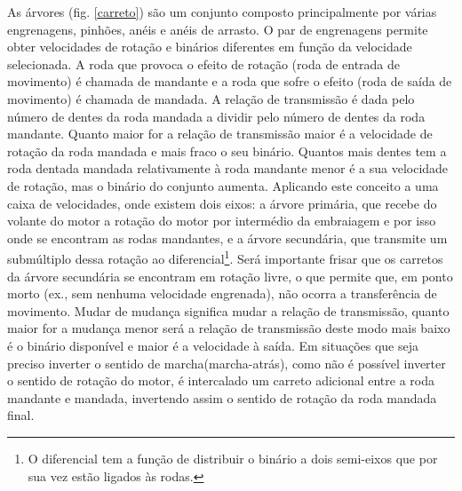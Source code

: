 As árvores (fig. \ref{carreto}) são um conjunto composto principalmente por várias engrenagens, pinhões, anéis e anéis de arrasto. O par de engrenagens permite obter velocidades de rotação e binários diferentes em função da velocidade selecionada. A roda que provoca o efeito de rotação (roda de entrada de movimento) é chamada de mandante e a roda que sofre o efeito (roda de saída de movimento) é chamada de mandada. A relação de transmissão é dada pelo número de dentes da roda mandada a dividir pelo número de dentes da roda mandante. Quanto maior for a relação de transmissão maior é a velocidade de rotação da roda mandada e mais fraco o seu binário. Quantos mais dentes tem a roda dentada mandada relativamente à roda mandante menor é a sua velocidade de rotação, mas o binário do conjunto aumenta. Aplicando este conceito a uma caixa de velocidades, onde existem dois eixos: a árvore primária, que recebe do volante do motor a rotação do motor por intermédio da embraiagem e por isso onde se encontram as rodas mandantes, e a árvore secundária, que transmite um submúltiplo dessa rotação ao diferencial\footnote{O diferencial tem a função de distribuir o binário a dois semi-eixos que por sua vez estão ligados às rodas.}. Será importante frisar que os carretos da árvore secundária se encontram em rotação livre, o que permite que, em ponto morto (ex., sem nenhuma velocidade engrenada), não ocorra a transferência de movimento.
Mudar de mudança significa mudar a relação de transmissão, quanto maior for a mudança menor será a relação de transmissão deste modo mais baixo é o binário disponível e maior é a velocidade à saída. Em situações que seja preciso inverter o sentido de marcha(marcha-atrás), como não é possível inverter o sentido de rotação do motor, é intercalado um carreto adicional entre a roda mandante e mandada, invertendo assim o sentido de rotação da roda mandada final.

